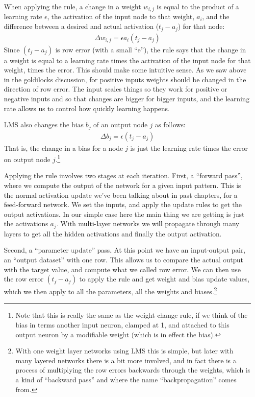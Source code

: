 When applying the rule, a change in a weight $w_{i,j}$ is equal to the product of a learning rate $\epsilon$, the activation of the input node to that weight, $a_i$, and the difference between a desired and actual activation ($t_j - a_j$) for that node:
\begin{eqnarray*}
\Delta w_{i,j}  =  \epsilon a_i (t_j - a_j)
\end{eqnarray*}
Since $(t_j - a_j)$ is row error  (with a small ``e''), the rule says that the change in a weight is equal to a learning rate times the activation of the input node for that weight, times the error. This should make some intuitive sense. As we saw above in the goldilocks discussion, for positive inputs weights should be changed in the direction of row error. The input scales things so they work for positive or negative inputs and so that changes are bigger for bigger inputs, and the learning rate allows us to control how quickly learning happens. 

LMS also changes the bias $b_j$ of an output node $j$ as follows: 
\begin{eqnarray*}
\Delta b_j  =  \epsilon (t_j - a_j)
\end{eqnarray*}
That is, the change in a bias for a node $j$ is just the learning rate times the error on output node $j$.\footnote{Note that this is really the same as the weight change rule, if we think of the bias in terms another input neuron, clamped at 1, and attached to this output neuron by a modifiable weight (which is in effect the bias).}

Applying the rule involves two stages at each iteration. First, a ``forward pass'', where we compute the output of the network for a given input pattern. This is the normal activation update we've been talking about in past chapters, for a feed-forward network. We set the inputs, and apply the update rules to get the output activations. In our simple case here the main thing we are getting is just the activations $a_j$.  With multi-layer  networks we will propagate through many layers to get all the hidden activations and finally the output activation. 

Second, a ``parameter update'' pass. At this point we have an  input-output pair, an ``output dataset'' with one row.  This allows us to compare the actual output with the target value, and compute what we called row error. We can then use the row error $ (t_j - a_j)$ to apply the rule and get weight and bias update values, which we then apply to all the parameters, all the weights and biases.\footnote{With one weight layer networks using LMS this is simple, but later with many layered networks there is a bit more involved, and in fact there is a process of multiplying the row errors backwards through the weights, which is a kind of ``backward pass'' and where the name ``backpropagation'' comes from.}


